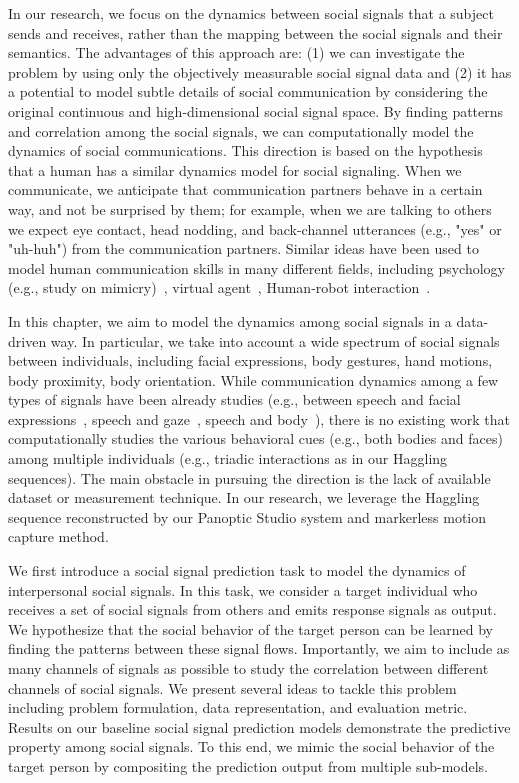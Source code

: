 In our research, we focus on the dynamics between social signals that a subject sends and receives, rather than the mapping between the social signals and their semantics. The advantages of this approach are: (1) we can investigate the problem by using only the objectively measurable social signal data and (2) it has a potential to model subtle details of social communication by considering the original continuous and high-dimensional social signal space. By finding patterns and correlation among the social signals, we can computationally model the dynamics of social communications. This direction is based on the hypothesis that a human has a similar dynamics model for social signaling. When we communicate, we anticipate that communication partners behave in a certain way, and not be surprised by them; for example, when we are talking to others we expect eye contact, head nodding, and back-channel utterances (e.g., "yes" or "uh-huh") from the communication partners. Similar ideas have been used to model human communication skills in many different fields, including psychology (e.g., study on mimicry)~\cite{bernieri1988synchrony}, virtual agent~\cite{morency2008predicting,morency2010modeling}, Human-robot interaction~\cite{huang2014learning}.

In this chapter, we aim to model the dynamics among social signals in a data-driven way. In particular, we take into account a wide spectrum of social signals between individuals, including facial expressions, body gestures, hand motions, body proximity, body orientation. While communication dynamics among a few types of signals have been already studies (e.g., between speech and facial expressions~\cite{kendon1980gesticulation, mcneill1992hand}, speech and gaze~\cite{griffin2001gaze}, speech and body~\cite{levine2010gesture}), there is no existing work that computationally studies the various behavioral cues (e.g., both bodies and faces) among multiple individuals (e.g., triadic interactions as in our Haggling sequences). The main obstacle in pursuing the direction is the lack of available dataset or measurement technique. In our research, we leverage the Haggling sequence reconstructed by our Panoptic Studio system and markerless motion capture method. %

We first introduce a social signal prediction task to model the dynamics of interpersonal social signals. In this task, we consider a target individual who receives a set of social signals from others and emits response signals as output. We hypothesize that the social behavior of the target person can be learned by finding the patterns between these signal flows. Importantly, we aim to include as many channels of signals as possible to study the correlation between different channels of social signals. We present several ideas to tackle this problem including problem formulation, data representation, and evaluation metric. Results on our baseline social signal prediction models demonstrate the predictive property among social signals. To this end, we mimic the social behavior of the target person by compositing the prediction output from multiple sub-models.

